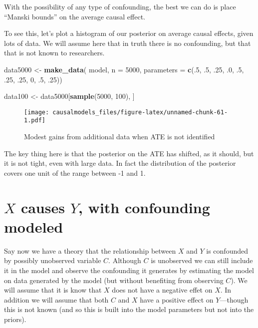 \documentclass[
  12pt,
]{book}
\newenvironment{Shaded}{\begin{snugshade}}{\end{snugshade}}
\newcommand{\AttributeTok}[1]{\textcolor[rgb]{0.13,0.29,0.53}{#1}}
\newcommand{\DecValTok}[1]{\textcolor[rgb]{0.00,0.00,0.81}{#1}}
\newcommand{\FunctionTok}[1]{\textcolor[rgb]{0.13,0.29,0.53}{\textbf{#1}}}
\newcommand{\NormalTok}[1]{#1}
\newcommand{\OtherTok}[1]{\textcolor[rgb]{0.56,0.35,0.01}{#1}}
\begin{document}
With the possibility of any type of confounding, the best we can do is place ``Manski bounds'' on the average causal effect.

To see this, let's plot a histogram of our posterior on average causal effects, given lots of data. We will assume here that in truth there is no confounding, but that that is not known to researchers.

\begin{Shaded}
\begin{Highlighting}[]
\NormalTok{data5000 }\OtherTok{\textless{}{-}} \FunctionTok{make\_data}\NormalTok{(}
\NormalTok{    model, }\AttributeTok{n =} \DecValTok{5000}\NormalTok{, }
    \AttributeTok{parameters =} \FunctionTok{c}\NormalTok{(.}\DecValTok{5}\NormalTok{, .}\DecValTok{5}\NormalTok{, .}\DecValTok{25}\NormalTok{, .}\DecValTok{0}\NormalTok{, .}\DecValTok{5}\NormalTok{, .}\DecValTok{25}\NormalTok{, .}\DecValTok{25}\NormalTok{, }\DecValTok{0}\NormalTok{, .}\DecValTok{5}\NormalTok{, .}\DecValTok{25}\NormalTok{))}

\NormalTok{data100 }\OtherTok{\textless{}{-}}\NormalTok{ data5000[}\FunctionTok{sample}\NormalTok{(}\DecValTok{5000}\NormalTok{, }\DecValTok{100}\NormalTok{), ]}
\end{Highlighting}
\end{Shaded}

\begin{figure}
\centering
\texttt{[image: causalmodels\_files/figure-latex/unnamed-chunk-61-1.pdf]}
\caption{\label{fig:unnamed-chunk-61}Modest gains from additional data when ATE is not identified}
\end{figure}

The key thing here is that the posterior on the ATE has shifted, as it should, but it is not tight, even with large data. In fact the distribution of the posterior covers one unit of the range between -1 and 1.

\hypertarget{x-causes-y-with-confounding-modeled}{%
\section{\texorpdfstring{\(X\) causes \(Y\), with confounding modeled}{X causes Y, with confounding modeled}}\label{x-causes-y-with-confounding-modeled}}

Say now we have a theory that the relationship between \(X\) and \(Y\) is confounded by possibly unobserved variable \(C\). Although \(C\) is unobserved we can still include it in the model and observe the confounding it generates by estimating the model on data generated by the model (but without benefiting from observing \(C\)).
We will assume that it is know that \(X\) does not have a negative effet on \(X\). In addition we will assume that both \(C\) and \(X\) have a positive effect on \(Y\)---though this is not known (and so this is built into the model parameters but not into the priors).
\end{document}
